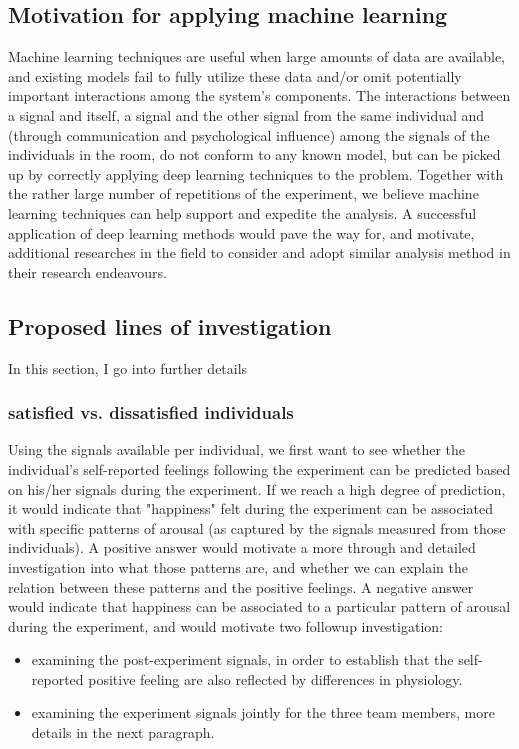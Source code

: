 \documentclass[a4paper, 11pt]{article}      %
\begin{document}
\subsection{Motivation for applying machine learning}
Machine learning techniques are useful when large amounts of data are available, and existing models fail to fully utilize these data and/or omit potentially important interactions among the system's components. The interactions between a signal and itself, a signal and the other signal from the same individual and (through communication and psychological influence) among the signals of the individuals in the room, do not conform to any known model, but can be picked up by correctly applying deep learning techniques to the problem. Together with the rather large number of repetitions of the experiment, we believe machine learning techniques can help support and expedite the analysis. A successful application of deep learning methods would pave the way for, and motivate, additional researches in the field to consider and adopt similar analysis method in their research endeavours.
\subsection{Proposed lines of investigation}
In this section, I go into further details 
\subsubsection{satisfied vs. dissatisfied individuals}
Using the signals available per individual, we first want to see whether the individual's self-reported feelings following the experiment can be predicted based on his/her signals during the experiment. If we reach a high degree of prediction, it would indicate that "happiness" felt during the experiment can be associated with specific patterns of arousal (as captured by the signals measured from those individuals). A positive answer would motivate a more through and detailed investigation into what those patterns are, and whether we can explain the relation between these patterns and the positive feelings. A negative answer would indicate that happiness can be associated to a particular pattern of arousal during the experiment, and would motivate two followup investigation:
\begin{itemize}
    \item examining the post-experiment signals, in order to establish that the self-reported positive feeling are also reflected by differences in physiology.
    \item examining the experiment signals jointly for the three team members, more details in the next paragraph.
\end{itemize}
\end{document}
